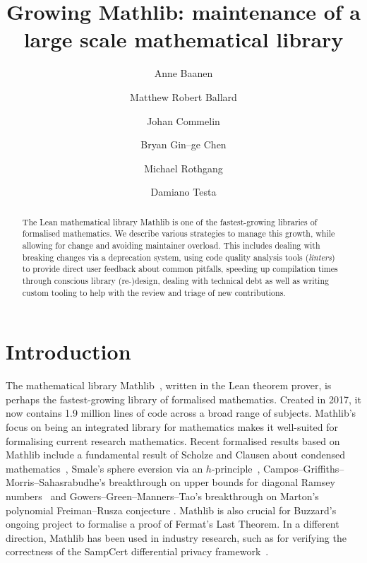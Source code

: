 \documentclass[runningheads]{llncs}
\def\Mathlib{Mathlib\xspace}
\def\mathlib{Mathlib\xspace}
\begin{document}
\title{Growing Mathlib: maintenance of a large scale mathematical library}
\author{Anne Baanen\and
Matthew Robert Ballard\and
Johan Commelin\and
Bryan Gin--ge Chen\and
Michael Rothgang\and
Damiano Testa}


\maketitle

\begin{abstract}
The Lean mathematical library \mathlib is one of the fastest-growing libraries of formalised mathematics.
We describe various strategies to manage this growth, while allowing for change and avoiding maintainer overload.
This includes dealing with breaking changes via a deprecation system,
using code quality analysis tools (\emph{linters}) to provide direct user feedback about common pitfalls,
speeding up compilation times through conscious library (re-)design,
dealing with technical debt
as well as writing custom tooling to help with the review and triage of new contributions.

\end{abstract}

\section{Introduction}

The mathematical library \Mathlib~\cite{Mathlib}, written in the Lean theorem prover, is perhaps the fastest-growing library of formalised mathematics. Created in 2017, it now contains 1.9 million lines of code across a broad range of subjects.
\Mathlib's focus on being an integrated library for mathematics makes it well-suited for formalising current research mathematics.
Recent formalised results based on \mathlib include a fundamental result of Scholze and Clausen about condensed mathematics~\cite{LTEChallenge,LTEFinal,CommelinTopazAbstractionBoundaries}, Smale's sphere eversion via an $h$-principle~\cite{SphereEversionCPP},
Campos--Griffiths--Morris--Sahasrabudhe's breakthrough on upper bounds for diagonal Ramsey numbers~\cite{MehtaDiagonalRamsey} and
Gowers--Green--Manners--Tao's breakthrough on Marton's polynomial Freiman--Rusza conjecture \cites{PFR1,PFR2,PFRImproved}.
\Mathlib is also crucial for Buzzard's ongoing project \cite{BuzzardFLT} to formalise a proof of Fermat's Last Theorem.
In a different direction, \mathlib has been used in industry research, such as for verifying the correctness of the SampCert differential privacy framework~\cite{SampCert}.
\end{document}
